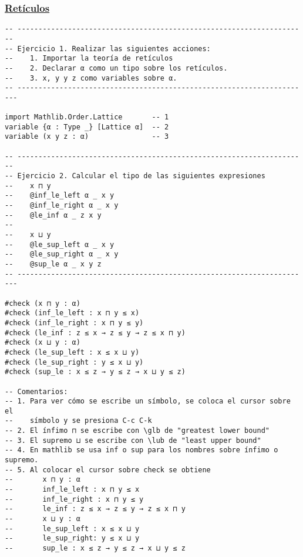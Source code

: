 \subsubsection{\href{./src/Basicos/Reticulos.lean}{Retículos}}
\label{sec:orgc9fe804}
\begin{verbatim}
-- ---------------------------------------------------------------------
-- Ejercicio 1. Realizar las siguientes acciones:
--    1. Importar la teoría de retículos
--    2. Declarar α como un tipo sobre los retículos.
--    3. x, y y z como variables sobre α.
-- ----------------------------------------------------------------------

import Mathlib.Order.Lattice       -- 1
variable {α : Type _} [Lattice α]  -- 2
variable (x y z : α)               -- 3

-- ---------------------------------------------------------------------
-- Ejercicio 2. Calcular el tipo de las siguientes expresiones
--    x ⊓ y
--    @inf_le_left α _ x y
--    @inf_le_right α _ x y
--    @le_inf α _ z x y
--
--    x ⊔ y
--    @le_sup_left α _ x y
--    @le_sup_right α _ x y
--    @sup_le α _ x y z
-- ----------------------------------------------------------------------

#check (x ⊓ y : α)
#check (inf_le_left : x ⊓ y ≤ x)
#check (inf_le_right : x ⊓ y ≤ y)
#check (le_inf : z ≤ x → z ≤ y → z ≤ x ⊓ y)
#check (x ⊔ y : α)
#check (le_sup_left : x ≤ x ⊔ y)
#check (le_sup_right : y ≤ x ⊔ y)
#check (sup_le : x ≤ z → y ≤ z → x ⊔ y ≤ z)

-- Comentarios:
-- 1. Para ver cómo se escribe un símbolo, se coloca el cursor sobre el
--    símbolo y se presiona C-c C-k
-- 2. El ínfimo ⊓ se escribe con \glb de "greatest lower bound"
-- 3. El supremo ⊔ se escribe con \lub de "least upper bound"
-- 4. En mathlib se usa inf o sup para los nombres sobre ínfimo o supremo.
-- 5. Al colocar el cursor sobre check se obtiene
--       x ⊓ y : α
--       inf_le_left : x ⊓ y ≤ x
--       inf_le_right : x ⊓ y ≤ y
--       le_inf : z ≤ x → z ≤ y → z ≤ x ⊓ y
--       x ⊔ y : α
--       le_sup_left : x ≤ x ⊔ y
--       le_sup_right: y ≤ x ⊔ y
--       sup_le : x ≤ z → y ≤ z → x ⊔ y ≤ z
\end{verbatim}

